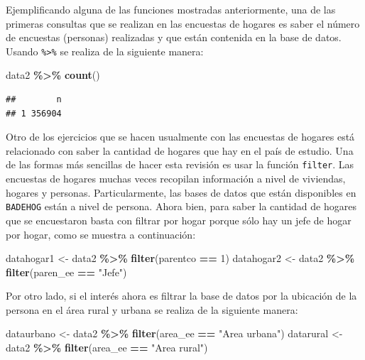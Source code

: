 \documentclass[
  12pt,
]{book}
\newenvironment{Shaded}{\begin{snugshade}}{\end{snugshade}}
\newcommand{\DecValTok}[1]{\textcolor[rgb]{0.00,0.00,0.81}{#1}}
\newcommand{\FunctionTok}[1]{\textcolor[rgb]{0.13,0.29,0.53}{\textbf{#1}}}
\newcommand{\NormalTok}[1]{#1}
\newcommand{\OtherTok}[1]{\textcolor[rgb]{0.56,0.35,0.01}{#1}}
\newcommand{\SpecialCharTok}[1]{\textcolor[rgb]{0.81,0.36,0.00}{\textbf{#1}}}
\newcommand{\StringTok}[1]{\textcolor[rgb]{0.31,0.60,0.02}{#1}}
\begin{document}
Ejemplificando alguna de las funciones mostradas anteriormente, una de las primeras consultas que se realizan en las encuestas de hogares es saber el número de encuestas (personas) realizadas y que están contenida en la base de datos. Usando \texttt{\%\textgreater{}\%} se realiza de la siguiente manera:

\begin{Shaded}
\begin{Highlighting}[]
\NormalTok{data2 }\SpecialCharTok{\%\textgreater{}\%} \FunctionTok{count}\NormalTok{()}
\end{Highlighting}
\end{Shaded}

\begin{verbatim}
##        n
## 1 356904
\end{verbatim}

Otro de los ejercicios que se hacen usualmente con las encuestas de hogares está relacionado con saber la cantidad de hogares que hay en el país de estudio. Una de las formas más sencillas de hacer esta revisión es usar la función \texttt{filter}. Las encuestas de hogares muchas veces recopilan información a nivel de viviendas, hogares y personas. Particularmente, las bases de datos que están disponibles en \texttt{BADEHOG} están a nivel de persona. Ahora bien, para saber la cantidad de hogares que se encuestaron basta con filtrar por hogar porque sólo hay un jefe de hogar por hogar, como se muestra a continuación:

\begin{Shaded}
\begin{Highlighting}[]
\NormalTok{datahogar1 }\OtherTok{\textless{}{-}}\NormalTok{ data2 }\SpecialCharTok{\%\textgreater{}\%} \FunctionTok{filter}\NormalTok{(parentco }\SpecialCharTok{==} \DecValTok{1}\NormalTok{)}
\NormalTok{datahogar2 }\OtherTok{\textless{}{-}}\NormalTok{ data2 }\SpecialCharTok{\%\textgreater{}\%} \FunctionTok{filter}\NormalTok{(paren\_ee }\SpecialCharTok{==} \StringTok{"Jefe"}\NormalTok{) }
\end{Highlighting}
\end{Shaded}

Por otro lado, si el interés ahora es filtrar la base de datos por la ubicación de la persona en el área rural y urbana se realiza de la siguiente manera:

\begin{Shaded}
\begin{Highlighting}[]
\NormalTok{dataurbano }\OtherTok{\textless{}{-}}\NormalTok{ data2 }\SpecialCharTok{\%\textgreater{}\%} 
  \FunctionTok{filter}\NormalTok{(area\_ee }\SpecialCharTok{==} \StringTok{"Area urbana"}\NormalTok{)}
\NormalTok{datarural }\OtherTok{\textless{}{-}}\NormalTok{ data2 }\SpecialCharTok{\%\textgreater{}\%} 
  \FunctionTok{filter}\NormalTok{(area\_ee }\SpecialCharTok{==} \StringTok{"Area rural"}\NormalTok{) }
\end{Highlighting}
\end{Shaded}
\end{document}

